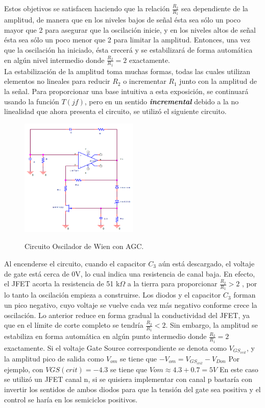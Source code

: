  Estos objetivos se satisfacen haciendo que la relación $\frac{R_2}{R_1}$ sea dependiente de la
amplitud, de manera que en los niveles bajos de señal ésta sea sólo un poco mayor que 2
para asegurar que la oscilación inicie, y en los niveles altos de señal ésta sea sólo un poco
menor que 2 para limitar la amplitud. Entonces, una vez que la oscilación ha iniciado, ésta
crecerá y se estabilizará de forma automática en algún nivel intermedio donde $\frac{R_2}{R_1}=2$
exactamente.\\
La estabilización de la amplitud toma muchas formas, todas las cuales utilizan elementos no lineales para reducir $R_2$ o incrementar $R_1$ junto con la amplitud de la señal. Para
proporcionar una base intuitiva a esta exposición, se continuará usando la función $T(jf)$,
pero en un sentido \emph{\textbf{incremental}} debido a la no linealidad que ahora presenta el circuito, se utilizó el siguiente circuito.\\
\begin{figure}[H]
	\centering
	\includegraphics[width=0.5\textwidth]{Imagenes-Ej1/oscCatedra.png}
	\label{fig:circosc}
	\caption{Circuito Oscilador de Wien con AGC.}
\end{figure}
Al encenderse el circuito, cuando el capacitor $C_3$ aún está descargado, el voltaje de gate está cerca de 0V, lo cual
indica una resistencia de canal baja. En efecto, el JFET acorta la resistencia de 51 k$\Omega$ a la
tierra para proporcionar $\frac{R_2}{R_1}>2$ , por lo tanto la oscilación
empieza a construirse. Los diodos y el capacitor $C_3$ forman un pico negativo, cuyo
voltaje se vuelve cada vez más negativo conforme crece la oscilación. Lo anterior reduce en
forma gradual la conductividad del JFET, ya que en el límite de corte completo se tendría $\frac{R_2}{R_1}<2$. Sin embargo, la amplitud se estabiliza en forma automática en
algún punto intermedio donde $\frac{R_2}{R_1}=2$ exactamente. Si el voltaje Gate Source correspondiente se denota como $V_{GS_{crit}}$, y la amplitud pico de salida como $V_{om}$ se tiene que $-V_{om} =V_{GS_{crit}} - V_{Don}$ Por ejemplo, con $VGS(crit) = -4.3$ se tiene que $Vom \approx 4.3 + 0.7 = 5 V$
En este caso se utilizó un JFET canal n, si se quisiera implementar con canal p bastaría con invertir los sentidos de ambos diodos para que la tensión del gate sea positiva y el control se haría en los semiciclos positivos.\\

